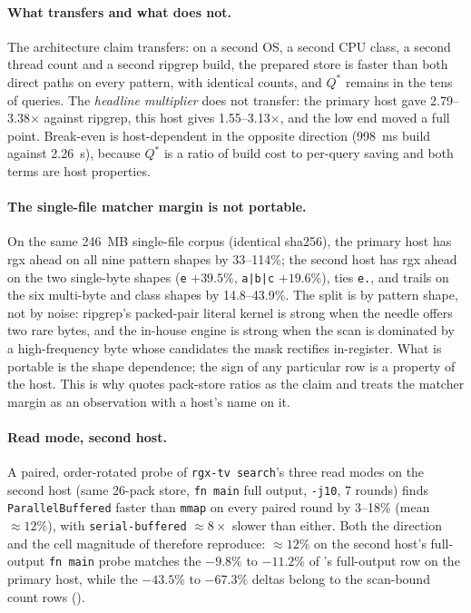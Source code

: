 \documentclass[11pt,letterpaper]{article}
\begin{document}
\paragraph{What transfers and what does not.}
The architecture claim transfers: on a second OS, a second CPU class, a
second thread count and a second ripgrep build, the prepared store is
faster than both direct paths on every pattern, with identical counts, and
$Q^{*}$ remains in the tens of queries. The \emph{headline multiplier} does
not transfer: the primary host gave 2.79--3.38$\times$ against ripgrep,
this host gives 1.55--3.13$\times$, and the low end moved a full point.
Break-even is host-dependent in the opposite direction (998~ms build
against 2.26~s), because $Q^{*}$ is a ratio of build cost to per-query
saving and both terms are host properties.

\paragraph{The single-file matcher margin is not portable.}
On the same 246~MB single-file corpus (identical sha256), the primary host
has rgx ahead on all nine pattern shapes by 33--114\%; the second host has
rgx ahead on the two single-byte shapes (\texttt{e} $+39.5\%$,
\texttt{a|b|c} $+19.6\%$), ties \texttt{e.}, and trails on the six
multi-byte and class shapes by 14.8--43.9\%. The split is by pattern
shape, not by noise: ripgrep's packed-pair literal kernel is strong when
the needle offers two rare bytes, and the in-house engine is strong when
the scan is dominated by a high-frequency byte whose candidates the mask
rectifies in-register. What is portable is the shape dependence; the sign
of any particular row is a property of the host. This is why
 quotes pack-store ratios as the claim and treats the
matcher margin as an observation with a host's name on it.

\paragraph{Read mode, second host.}
A paired, order-rotated probe of \texttt{rgx-tv search}'s three read modes
on the second host (same 26-pack store, \texttt{fn main} full output,
\texttt{-j10}, 7 rounds) finds \texttt{ParallelBuffered} faster than
\texttt{mmap} on every paired round by 3--18\% (mean $\approx 12\%$), with
\texttt{serial-buffered} $\approx 8\times$ slower than either. Both the
direction and the cell magnitude of  therefore reproduce:
$\approx 12\%$ on the second host's full-output \texttt{fn main} probe
matches the $-9.8\%$ to $-11.2\%$ of 's full-output row on
the primary host, while the $-43.5\%$ to $-67.3\%$ deltas belong to the
scan-bound count rows ().
\end{document}

